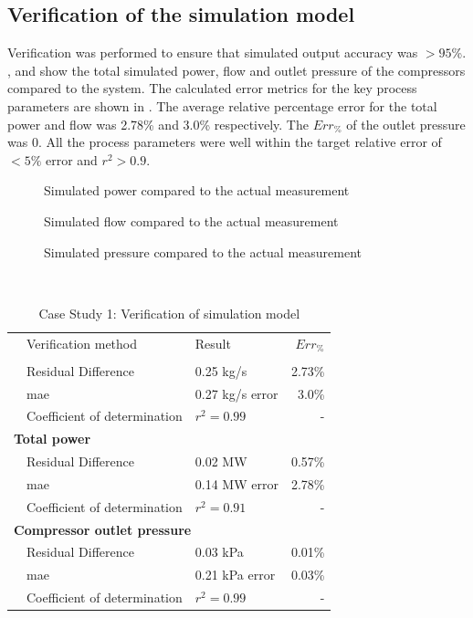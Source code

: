 \subsection{Verification of the simulation model}
Verification was performed to ensure that simulated output accuracy was $>95$\%. ,  and  show the total simulated power, flow and outlet pressure of the compressors compared to the system. The calculated error metrics for the key process parameters are shown in . The average relative percentage error for the total power and flow was 2.78\% and 3.0\% respectively. The $Err_{\%}$ of the outlet pressure was 0. All the process parameters were well within the target relative error of $ <5\% $ error and $r^2 > 0.9$. 
\begin{figure}[h!]
	\centering
	
	\caption{Simulated power compared to the actual measurement}
	\label{fig: Verification power Beatrix}
\end{figure}
\begin{figure}[h!]
	\centering
	
	\caption{Simulated flow compared to the actual measurement}
	\label{fig: Verification flow Beatrix}
\end{figure}
\begin{figure}[h!]
	\centering
	
	\caption{Simulated pressure compared to the actual measurement}
	\label{fig: Verification Pressure Beatrix}
\end{figure}\\
 \begin{table}[h!]
 	\caption{Case Study 1: Verification of simulation model}
	\centering
	\begin{tabular}{p{0.5cm}p{8cm}p{5cm}r}
		\hline
		&Verification method & Result & $Err_{\%}$\\
		\hhline{====}
		\multicolumn{4}{l}{\textbf{ Total Flow}}\\
		&Residual Difference  & 0.25 kg/s & 2.73\% \\
		&\gls{mae} 					 & 0.27 kg/s error & 3.0\% \\
		&Coefficient of determination & $r^2 =0.99$ & -\\ 
		\multicolumn{4}{l}{\textbf{ Total power}}\\
		&Residual Difference  & 0.02 MW & 0.57\% \\
		&\gls{mae} 					 & 0.14 MW error & 2.78\% \\
		&Coefficient of determination & $r^2 =0.91$ & -\\ 
		\multicolumn{4}{l}{\textbf{ Compressor outlet pressure}}\\
		&Residual Difference  &0.03 kPa & 0.01\% \\
		&\gls{mae} 					 & 0.21 kPa error & 0.03\% \\
		&Coefficient of determination & $r^2 =0.99$ & -\\
		\hline
	\end{tabular} 
	\label{Beet verification table}
\end{table}
